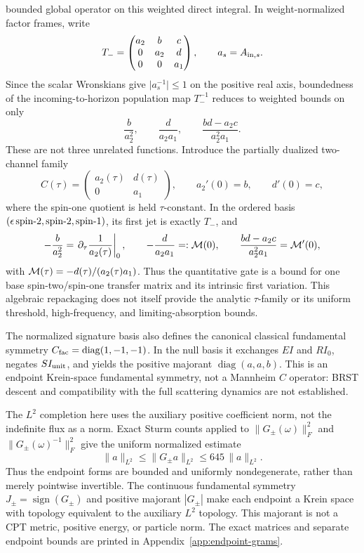 \documentclass[11pt]{article}
\theoremstyle{definition}
\theoremstyle{remark}
\begin{document}
bounded global operator on this weighted direct integral.
In weight-normalized factor frames, write
\[
 T_-=\begin{pmatrix}
 a_2&b&c\\0&a_2&d\\0&0&a_1
 \end{pmatrix},
 \qquad a_s=A_{{\rm in},s}.
\]
Since the scalar Wronskians give \(\lvert a_s^{-1}\rvert\leq1\) on the
positive real axis, boundedness of the incoming-to-horizon population map
\(T_-^{-1}\) reduces to weighted bounds on only
\[
 \frac{b}{a_2^2},\qquad
 \frac{d}{a_2a_1},\qquad
 \frac{bd-a_2c}{a_2^2a_1}.
\]
These are not three unrelated functions.  Introduce the partially dualized
two-channel family
\[
 C(\tau)=
 \begin{pmatrix}a_2(\tau)&d(\tau)\\0&a_1\end{pmatrix},
 \qquad
 a_2'(0)=b,\qquad d'(0)=c,
\]
where the spin-one quotient is held \(\tau\)-constant.  In the ordered basis
\((\epsilon\,{\rm spin}\text{-}2,{\rm spin}\text{-}2,{\rm spin}\text{-}1)\),
its first jet is exactly \(T_-\), and
\[
 -\frac{b}{a_2^2}
 =\left.\partial_\tau\frac1{a_2(\tau)}\right|_0,
 \qquad
 -\frac{d}{a_2a_1}=:{\cal M}(0),
 \qquad
 \frac{bd-a_2c}{a_2^2a_1}={\cal M}'(0),
\]
with \({\cal M}(\tau)=-d(\tau)/(a_2(\tau)a_1)\).
Thus the quantitative gate is a bound for one base spin-two/spin-one
transfer matrix and its intrinsic first variation.  This algebraic
repackaging does not itself provide the analytic \(\tau\)-family or its
uniform threshold, high-frequency, and limiting-absorption bounds.

The normalized signature basis also defines the canonical classical
fundamental symmetry \(C_{\rm fac}=\operatorname{diag}(1,-1,-1)\).
In the null basis it exchanges \(EI\) and \(RI_0\), negates
\(SI_{\rm unit}\), and yields the positive majorant
\(\operatorname{diag}(a,a,b)\).  This is an endpoint Krein-space
fundamental symmetry, not a Mannheim \(C\) operator: BRST descent and
compatibility with the full scattering dynamics are not established.

The \(L^2\) completion here uses the auxiliary positive coefficient norm,
not the indefinite flux as a norm.  Exact Sturm counts applied to
\(\|G_\pm(\omega)\|_F^2\) and
\(\|G_\pm(\omega)^{-1}\|_F^2\) give the uniform normalized estimate
\begin{equation}\label{eq:endpoint-uniform-l2}
 \|a\|_{L^2}\leq \|G_\pm a\|_{L^2}
 \leq 645\,\|a\|_{L^2}.
\end{equation}
Thus the endpoint forms are bounded and uniformly nondegenerate, rather
than merely pointwise invertible.  The continuous fundamental symmetry
\(J_\pm=\operatorname{sign}(G_\pm)\) and positive majorant \(|G_\pm|\)
make each endpoint a Krein space with topology equivalent to the auxiliary
\(L^2\) topology.  This majorant is not a CPT metric, positive energy, or
particle norm.  The exact matrices and separate endpoint bounds are printed
in Appendix~\ref{app:endpoint-grams}.
\end{document}
